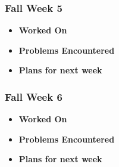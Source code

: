 \documentclass[compsoc,draftclsnofoot,onecolumn,10pt]{IEEEtran}
\begin{document}
\subsubsection{Fall Week 5}
\begin{itemize}
    \item {\textbf{Worked On}}
    \begin{itemize}

    \end{itemize}

    \item {\textbf{Problems Encountered}}
    \begin{itemize}

    \end{itemize}

    \item{\textbf{Plans for next week}}
    \begin{itemize}

    \end{itemize}

\end{itemize}

\subsubsection{Fall Week 6}
\begin{itemize}
    \item {\textbf{Worked On}}
    \begin{itemize}

    \end{itemize}

    \item {\textbf{Problems Encountered}}
    \begin{itemize}

    \end{itemize}

    \item{\textbf{Plans for next week}}
    \begin{itemize}

    \end{itemize}

\end{itemize}
\end{document}
